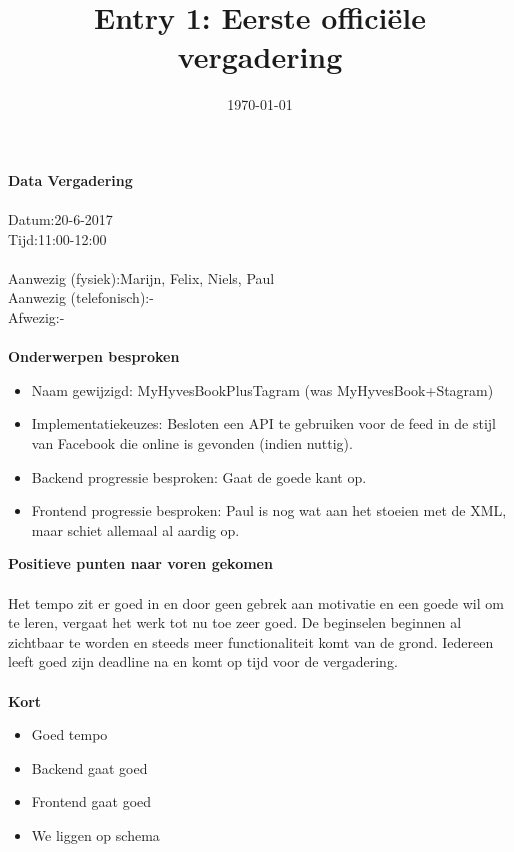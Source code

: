\documentclass{uva-inf-article}
\title{Entry 1: Eerste offici\"ele vergadering}
\date{\today}
\newcommand\tab[1][1cm]{\hspace*{#1}}
\newcommand\tabb[1][1.4cm]{\hspace*{#1}}
\begin{document}
\maketitle

\noindent
\textbf{Data Vergadering}\\\\
Datum:\tab 20-6-2017
\\
Tijd:\tabb 11:00-12:00
\\\\
\noindent
Aanwezig (fysiek):\tabb\space\space\space Marijn, Felix, Niels, Paul\\
Aanwezig (telefonisch):\tab	-\\
Afwezig:\tabb\tabb\space\space\space\space-\\\\
\noindent
\textbf{Onderwerpen besproken}

\begin{itemize}
\item Naam gewijzigd:		MyHyvesBookPlusTagram (was MyHyvesBook+Stagram)
\item Implementatiekeuzes:		Besloten een API te gebruiken voor de feed in de stijl van Facebook die online is gevonden (indien nuttig).
\item Backend progressie besproken: 	Gaat de goede kant op.
\item Frontend progressie besproken:	Paul is nog wat aan het stoeien met de XML, maar schiet allemaal al aardig op.
\end{itemize}
\pagebreak

\noindent
\textbf{Positieve punten naar voren gekomen}\\\\
Het tempo zit er goed in en door geen gebrek aan motivatie en een goede wil om te leren, vergaat het werk tot nu toe zeer goed. De beginselen beginnen al zichtbaar te worden en steeds meer functionaliteit komt van de grond. Iedereen leeft goed zijn deadline na en komt op tijd voor de vergadering.
\\\\

\noindent
\textbf{Kort}
\begin{itemize}
\item Goed tempo
\item Backend gaat goed
\item Frontend gaat goed
\item We liggen op schema
\end{itemize}
\end{document}
